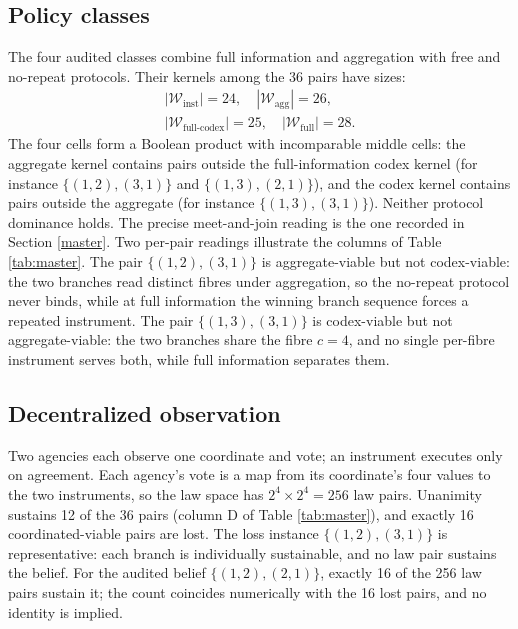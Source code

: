 \documentclass[10pt,twocolumn]{article}
\theoremstyle{definition}
\begin{document}
\subsection{Policy classes}\label{classes}

The four audited classes combine full information and aggregation with
free and no-repeat protocols. Their kernels among the 36 pairs have
sizes:
\begin{gather*}
|\mathcal{W}_{\mathrm{inst}}| = 24,\quad
|\mathcal{W}_{\mathrm{agg}}| = 26,\\
|\mathcal{W}_{\mathrm{full\text{-}codex}}| = 25,\quad
|\mathcal{W}_{\mathrm{full}}| = 28 .
\end{gather*}
The four cells form a Boolean product with incomparable middle cells:
the aggregate kernel contains pairs outside the full-information codex
kernel (for instance \(\{(1,2),(3,1)\}\) and \(\{(1,3),(2,1)\}\)), and
the codex kernel contains pairs outside the aggregate (for instance
\(\{(1,3),(3,1)\}\)). Neither protocol dominance holds. The precise
meet-and-join reading is the one recorded in Section \ref{master}. Two
per-pair readings illustrate the columns of Table \ref{tab:master}. The
pair \(\{(1,2),(3,1)\}\) is aggregate-viable but not codex-viable: the
two branches read distinct fibres under aggregation, so the no-repeat
protocol never binds, while at full information the winning branch
sequence forces a repeated instrument. The pair \(\{(1,3),(3,1)\}\) is
codex-viable but not aggregate-viable: the two branches share the fibre
\(c = 4\), and no single per-fibre instrument serves both, while
full information separates them.

\subsection{Decentralized observation}\label{decentralized}

Two agencies each observe one coordinate and vote; an instrument
executes only on agreement. Each agency's vote is a map from its
coordinate's four values to the two instruments, so the law space has
\(2^{4} \times 2^{4} = 256\) law pairs. Unanimity sustains 12 of the
36 pairs (column D of Table \ref{tab:master}), and exactly 16
coordinated-viable pairs are lost. The loss instance
\(\{(1,2),(3,1)\}\) is representative: each branch is individually
sustainable, and no law pair sustains the belief. For the audited belief
\(\{(1,2),(2,1)\}\), exactly 16 of the 256 law pairs sustain it; the
count coincides numerically with the 16 lost pairs, and no identity is
implied.
\end{document}
